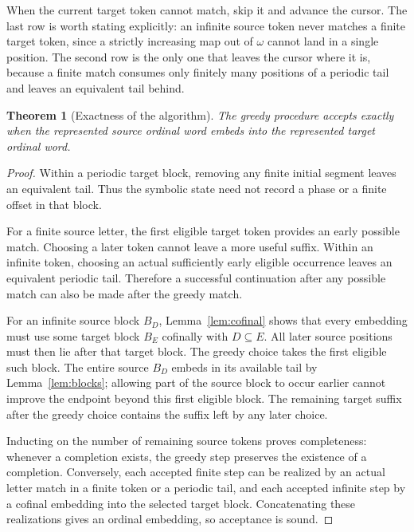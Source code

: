 \documentclass[11pt,a4paper]{article}
\numberwithin{equation}{section}
\newtheorem{theorem}{Theorem}[section]
\theoremstyle{definition}
\theoremstyle{remark}
\begin{document}
When the current target token cannot match, skip it and advance the cursor.
The last row is worth stating explicitly: an infinite source token never
matches a finite target token, since a strictly increasing map out of $\omega$
cannot land in a single position. The second row is the only one that leaves
the cursor where it is, because a finite match consumes only finitely many
positions of a periodic tail and leaves an equivalent tail behind.

\begin{theorem}[Exactness of the algorithm]\label{thm:algorithm}
The greedy procedure accepts exactly when the represented source ordinal
word embeds into the represented target ordinal word.
\end{theorem}
\begin{proof}
Within a periodic target block, removing any finite initial segment leaves
an equivalent tail. Thus the symbolic state need not record a phase or a
finite offset in that block.

For a finite source letter, the first eligible target token provides an
early possible match. Choosing a later token cannot leave a more useful
suffix. Within an infinite token, choosing an actual sufficiently early
eligible occurrence leaves an equivalent periodic tail. Therefore a
successful continuation after any possible match can also be made after
the greedy match.

For an infinite source block $B_D$, Lemma~\ref{lem:cofinal} shows that every
embedding must use some target block $B_E$ cofinally with $D\subseteq E$.
All later source positions must then lie after that target block. The
greedy choice takes the first eligible such block. The entire source
$B_D$ embeds in its available tail by Lemma~\ref{lem:blocks}; allowing
part of the source block to occur earlier cannot improve the endpoint
beyond this first eligible block. The remaining target suffix after the
greedy choice contains the suffix left by any later choice.

Inducting on the number of remaining source tokens proves completeness:
whenever a completion exists, the greedy step preserves the existence of
a completion. Conversely, each accepted finite step can be realized by
an actual letter match in a finite token or a periodic tail, and each
accepted infinite step by a cofinal embedding into the selected target
block. Concatenating these realizations gives an ordinal embedding, so
acceptance is sound.
\end{proof}
\end{document}
